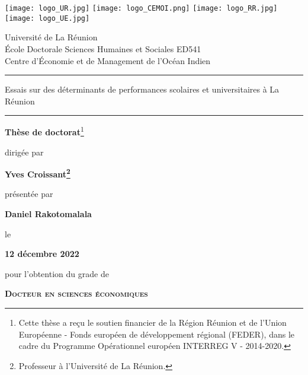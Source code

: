 
\begin{titlepage}
\begin{center}

  \texttt{[image: logo\_UR.jpg]} \hfill 
  \texttt{[image: logo\_CEMOI.png]} \hfill
  \texttt{[image: logo\_RR.jpg]} \hfill
  \texttt{[image: logo\_UE.jpg]}

	\vfill

{
\small
Université de La Réunion \\
École Doctorale Sciences Humaines et Sociales ED541 \\
Centre d'Économie et de Management de l'Océan Indien
}


\vfill

 {
 \Large\bfseries 
 \rule{\linewidth}{1pt} 
 Essais sur des déterminants de performances scolaires et universitaires à La Réunion 
 \rule{\linewidth}{1pt}
 }
 
	\vfill
	
{
\renewcommand*{\thefootnote}{\fnsymbol{footnote}}
\textbf{Thèse de doctorat}\footnote[2]{
\small
Cette thèse a reçu le soutien financier de la Région Réunion et de l'Union Européenne - Fonds européen de développement régional (FEDER), dans le cadre du Programme Opérationnel européen INTERREG V - 2014-2020.
}
\renewcommand*{\thefootnote}{\arabic{footnote}}
} 

	\vfill

{dirigée par}

  \vfill

{
\renewcommand*{\thefootnote}{\fnsymbol{footnote}}
\textbf{Yves Croissant\footnote[1]{
\small 
Professeur à l'Université de La Réunion.
}}}

  \vfill

{présentée par}

	\vfill
	
{\textbf{Daniel Rakotomalala}}
	
	\vfill

{le}

  \vfill

{\textbf{12 décembre 2022}}	

  \vfill
	
{pour l'obtention du grade de} 

	\vfill
	
{\textsc{\textbf{{Docteur en sciences économiques}}}} 

	\vfill
	

\end{center}
\end{titlepage}
